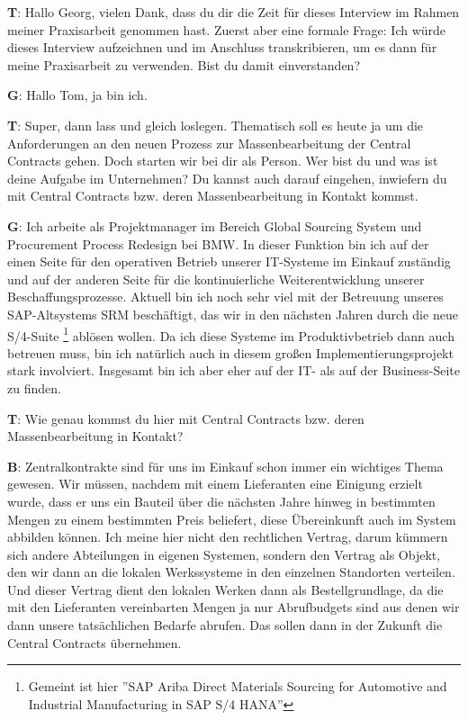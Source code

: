 \begin{list}{X:}{\setlength{\labelsep}{5mm}}
 \linenumbers[1]
 \item[\textbf{T}:] Hallo Georg, vielen Dank, dass du dir die Zeit für dieses Interview im Rahmen meiner Praxisarbeit genommen hast. Zuerst aber eine formale Frage: Ich würde dieses Interview aufzeichnen und im Anschluss transkribieren, um es dann für meine Praxisarbeit zu verwenden. Bist du damit einverstanden?
 \item[\textbf{G}:] Hallo Tom, ja bin ich.
 \item[\textbf{T}:] Super, dann lass und gleich loslegen. Thematisch soll es heute ja um die Anforderungen an den neuen Prozess zur Massenbearbeitung der Central Contracts gehen. Doch starten wir bei dir als Person. Wer bist du und was ist deine Aufgabe im Unternehmen? Du kannst auch darauf eingehen, inwiefern du mit Central Contracts bzw. deren Massenbearbeitung in Kontakt kommst.
 \item[\textbf{G}:] Ich arbeite als Projektmanager im Bereich Global Sourcing System und Procurement Process Redesign bei BMW. In dieser Funktion bin ich auf der einen Seite für den operativen Betrieb unserer IT-Systeme im Einkauf zuständig und auf der anderen Seite für die kontinuierliche Weiterentwicklung unserer Beschaffungsprozesse. Aktuell bin ich noch sehr viel mit der Betreuung unseres SAP-Altsystems SRM beschäftigt, das wir in den nächsten Jahren durch die neue S/4-Suite \footnote{Gemeint ist hier ''SAP Ariba Direct Materials Sourcing for Automotive and Industrial Manufacturing in SAP S/4 HANA''} ablösen wollen. Da ich diese Systeme im Produktivbetrieb dann auch betreuen muss,  bin ich natürlich auch in diesem gro\ss en Implementierungsprojekt stark involviert. Insgesamt bin ich aber eher auf der IT- als auf der Business-Seite zu finden.
 \item[\textbf{T}:] Wie genau kommst du hier mit Central Contracts bzw. deren Massenbearbeitung in Kontakt?
 \item[\textbf{B}:] Zentralkontrakte sind für uns im Einkauf schon immer ein wichtiges Thema gewesen. Wir müssen, nachdem mit einem Lieferanten eine Einigung erzielt wurde, dass er uns ein Bauteil über die nächsten Jahre hinweg in bestimmten Mengen zu einem bestimmten Preis beliefert, diese Übereinkunft auch im System abbilden können. Ich meine hier nicht den rechtlichen Vertrag, darum kümmern sich andere Abteilungen in eigenen Systemen, sondern den Vertrag als Objekt, den wir dann an die lokalen Werkssysteme in den einzelnen Standorten verteilen. Und dieser Vertrag dient den lokalen Werken dann als Bestellgrundlage, da die mit den Lieferanten vereinbarten Mengen ja nur Abrufbudgets sind aus denen wir dann unsere tatsächlichen Bedarfe abrufen. Das sollen dann in der Zukunft die Central Contracts übernehmen.

\end{list}
